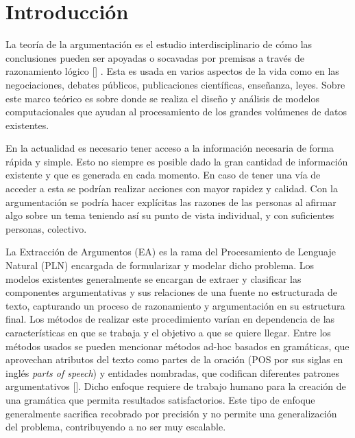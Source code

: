 \chapter*{Introducción}\label{chapter:introduction}


La teoría de la argumentación es el estudio interdisciplinario de cómo las conclusiones
pueden ser apoyadas o socavadas por premisas a través de razonamiento lógico [\cite{wiki-arg-theory}] .
Esta es usada en varios aspectos de la vida como en las negociaciones, debates públicos, publicaciones
científicas, enseñanza, leyes. Sobre este marco teórico es sobre donde se realiza el diseño y análisis de 
modelos computacionales que ayudan al procesamiento de los grandes volúmenes de datos existentes.

En la actualidad es necesario tener acceso a la información necesaria
de forma rápida y simple. Esto no siempre es posible dado la gran cantidad de información existente y
que es generada en cada momento. En caso de tener una vía de acceder a esta se podrían realizar acciones
con mayor rapidez y calidad. Con la argumentación se podría hacer explícitas las razones de las personas 
al afirmar algo sobre un tema teniendo así su punto de vista individual, y con suficientes personas, colectivo.


La Extracción de Argumentos (EA) es la rama del Procesamiento de Lenguaje Natural (PLN) encargada de formularizar
y modelar dicho problema. Los modelos existentes generalmente se encargan de
extraer y clasificar las componentes argumentativas y sus relaciones de una fuente no estructurada de 
texto, capturando un proceso de razonamiento y argumentación en su estructura final. Los métodos
de realizar este procedimiento varían en dependencia de las características en que se trabaja y el objetivo
a que se quiere llegar. Entre los métodos usados se pueden mencionar métodos ad-hoc basados en gramáticas,
que aprovechan atributos del texto como partes de la oración (POS por sus siglas en inglés \emph{parts of speech}) 
y entidades nombradas, que codifican diferentes 
patrones argumentativos [\cite{dykes2020reconstructing}]. Dicho enfoque requiere de trabajo 
humano para la creación de una gramática que permita resultados satisfactorios. Este tipo de enfoque
generalmente sacrifica recobrado por precisión y no permite una generalización del problema, contribuyendo
a no ser muy escalable.

